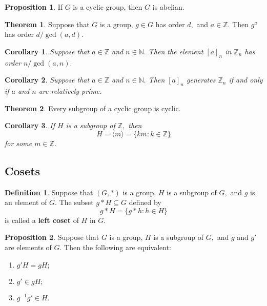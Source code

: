 \documentclass[12pt, a4paper]{article}
\newcommand{\bb}[1]{\mathbb{#1}}
\theoremstyle{definition}
\newtheorem{definition}{Definition}[section]
\newtheorem{theorem}{Theorem}[section]
\newtheorem{proposition}{Proposition}
\theoremstyle{plain}
\newtheorem{corollary}{Corollary}[theorem]
\begin{document}
\begin{proposition}
If $G$ is a cyclic group, then $G$ is abelian.
\end{proposition}

\begin{theorem}
Suppose that $G$ is a group, $g \in G$ has order $d,$ and $a \in \bb{Z}.$ Then $g^a$ has order $d/ \gcd(a, d).$
\end{theorem}

\begin{corollary}
Suppose that $a \in \bb{Z}$ and $n \in \bb{N}.$ Then the element $[a]_n$ in $\bb{Z}_n$ has order $n/\gcd(a,n).$
\end{corollary}

\begin{corollary}
Suppose that $a \in \bb{Z}$ and $n \in \bb{N}.$ Then $[a]_n$ generates $\bb{Z}_n$ if and only if $a$ and $n$ are relatively prime.
\end{corollary}

\begin{theorem}
Every subgroup of a cyclic group is cyclic.
\end{theorem}

\begin{corollary}
If $H$ is a subgroup of $\bb{Z},$ then 
$$H=\langle m \rangle=\{km : k \in \bb{Z}\}$$
for some $m\in \bb{Z}.$
\end{corollary}

\subsection{Cosets}

\begin{definition}
Suppose that $(G,*)$ is a group, $H$ is a subgroup of $G,$ and $g$ is an element of $G.$ The subset $g*H \subseteq G$ defined by 
$$g*H=\{g*h : h\in H\}$$
is called a \textbf{left coset} of $H$ in $G.$
\end{definition}

\begin{proposition}
Suppose that $G$ is a group, $H$ is a subgroup of $G,$ and $g$ and $g'$ are elements of $G.$ Then the following are equivalent: 
\begin{enumerate}
	
	\item $g'H=gH;$

	\item $g' \in gH;$

	\item $g^{-1}g'\in H.$

\end{enumerate}
\end{proposition}
\end{document}
